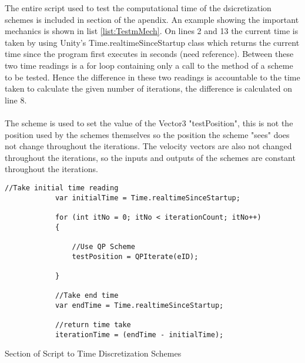 The entire script used to test the computational time of the dsicretization schemes is included in section of the apendix. An example showing the important mechanics is shown in list \ref{list:TestmMech}. On lines 2 and 13 the current time is taken by using Unity's Time.realtimeSinceStartup class which returns the current time since the program first executes in seconds (need reference). Between these two time readings is a for loop containing only a call to the method of a scheme to be tested. Hence the difference in these two readings is accountable to the time taken to calculate the given number of iterations, the difference is calculated on line 8.
\\\\
The scheme is used to set the value of the Vector3 "testPosition", this is not the position used by the schemes themselves so the position the scheme "sees" does not change throughout the iterations. The velocity vectors are also not changed throughout the iterations, so the inputs and outputs of the schemes are constant throughout the iterations.

\begin{listing}[H]
\begin{verbatim}
//Take initial time reading
            var initialTime = Time.realtimeSinceStartup;

            for (int itNo = 0; itNo < iterationCount; itNo++)
            {

                //Use QP Scheme
                testPosition = QPIterate(eID);

            }

            //Take end time
            var endTime = Time.realtimeSinceStartup;

            //return time take
            iterationTime = (endTime - initialTime);
\end{verbatim}
\caption{Section of Script to Time Discretization Schemes}
\label{list:TestmMech}
\end{listing}

